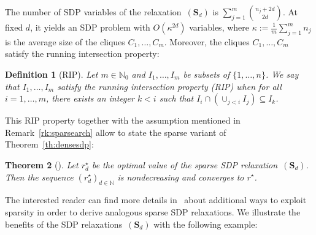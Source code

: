 \documentclass[preprint]{sigplanconf}
\newcommand{\N}{\mathbb{N}}
\def\S{\mathbf{S}}
\def\S{\mathbf{S}}
\newtheorem{theorem}{Theorem}[section]
\theoremstyle{plain}
\newtheorem{definition}[theorem]{Definition}
\begin{document}
The number of SDP variables of the relaxation~$(\S_d)$ is $\sum_{j=1}^m \binom{n_j + 2 d}{2 d}$. At fixed $d$, it yields an SDP problem with $O(\kappa^{2d})$ variables, where $\kappa := \frac{1}{m} \sum_{j=1}^m n_j$ is the average size of the cliques $C_1, \dots, C_m$.
%
Moreover, the cliques $C_1, \dots, C_m$ satisfy the running intersection property: 
%
\begin{definition}[RIP]
\label{def:rip}
Let $m \in \N_0$  and $I_1, \dots, I_m$ be subsets of $\{1, \dots, n\}$. We say that $I_1, \dots, I_m$ satisfy the running intersection property (RIP) when for all $i=1, \dots, m$, there exists an integer $k < i$ such that $I_i \cap (\cup_{j < i} I_j) \subseteq I_k$.
\end{definition}
This RIP property together with the assumption mentioned in Remark~\ref{rk:sparsearch} allow to state the sparse variant of Theorem~\ref{th:densesdp}:
%
\begin{theorem}[]
\label{th:sparsesdp}
Let $r_d^{\star}$ be the optimal value of the sparse SDP relaxation~$(\S_d)$. Then the sequence $(r_d^{\star})_{d \in \N}$ is nondecreasing and converges to $r^\star$.
\end{theorem}
The interested reader can find more details in~\cite{Waki06SparseSOS} about additional ways to exploit sparsity in order to derive analogous sparse SDP relaxations.
We illustrate the benefits of the SDP relaxations~$(\S_d)$ with the following example:
\end{document}
